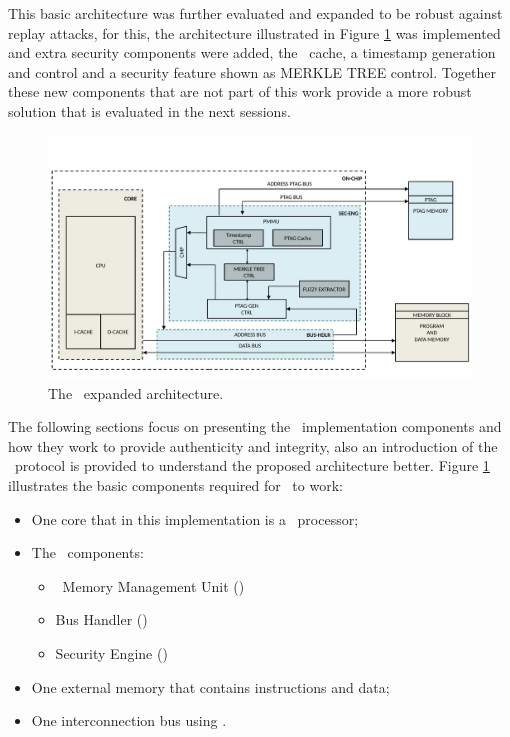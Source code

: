 This basic architecture was further evaluated and expanded to be robust against replay attacks, for this,  the architecture illustrated in Figure \ref{fig:cshiaexpanded} was implemented and extra security components were added, the \ptag~cache, a timestamp generation and control and a security feature shown as MERKLE TREE control. Together these new components that are not part of this work provide a more robust solution that is evaluated in the next sessions. 



\begin{figure}[!ht]
    \centering
    \includegraphics[width=\textwidth]{figures/pdf/CSHIA_detailed_caio_expansion.pdf}
    \caption{The \cshia~expanded architecture.}
    \label{fig:cshiaexpanded}
\end{figure}
 The following sections focus on presenting the \cshia~implementation components and how they work to provide authenticity and integrity, also an introduction of the \amba~protocol is provided to understand the proposed architecture better. Figure \ref{fig:cshiaexpanded} illustrates the basic components required for \cshia~to work: 
\begin{itemize}
    \item One core that in this implementation is a \leon~processor;
    \item The \cshia~components:
    \begin{itemize}
        \item \ptag~Memory Management Unit (\pmmu)
        \item Bus Handler (\handler)
        \item Security Engine (\seceng) 
    \end{itemize}
    \item One external memory that contains instructions and data;
    \item One interconnection bus using \amba.
\end{itemize} 


